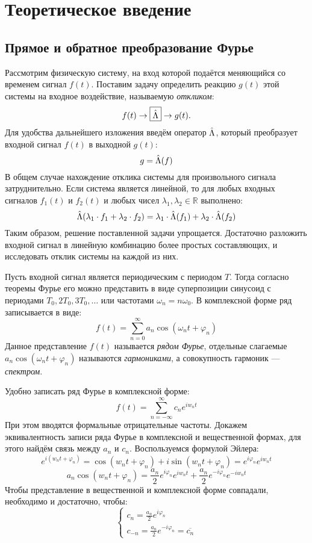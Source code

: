 \section*{Теоретическое введение}

\subsection*{Прямое и обратное преобразование Фурье}

Рассмотрим физическую систему, на вход которой подаётся меняющийся со временем сигнал $f(t)$. Поставим задачу определить реакцию $g(t)$ этой системы на входное воздействие, называемую \textit{откликом}:
$$
f(t) \rightarrow \boxed{\hat{\Lambda}} \rightarrow g(t).
$$
Для удобства дальнейшего изложения введём оператор $\hat{\Lambda}$, который преобразует входной сигнал $f(t)$ в выходной $g(t)$:
$$
g = \hat{\Lambda}(f)
$$
В общем случае нахождение отклика системы для произвольного сигнала затруднительно. Если система является линейной, то для любых входных сигналов $f_1(t)$ и $f_2(t)$ и любых чисел $\lambda_1, \lambda_2 \in \mathbb{R}$ выполнено:
$$
\hat{\Lambda}(\lambda_1 \cdot f_1 + \lambda_2 \cdot f_2) = \lambda_1 \cdot \hat{\Lambda}(f_1) + \lambda_2 \cdot \hat{\Lambda}(f_2)
$$
Таким образом, решение поставленной задачи упрощается. Достаточно разложить входной сигнал в линейную комбинацию более простых составляющих, и исследовать отклик системы на каждой из них.

Пусть входной сигнал является периодическим с периодом $T$. Тогда согласно теоремы Фурье его можно представить в виде суперпозиции синусоид с периодами $T_0, 2T_0, 3T_0, \dots$ или частотами $\omega_n = n \omega_0$. В комплексной форме ряд записывается в виде:
$$
f(t) = \sum_{n = 0}^{\infty}{a_n \cos{(\omega_n t + \varphi_n)}}
$$
Данное представление $f(t)$ называется \textit{рядом Фурье}, отдельные слагаемые $a_n \cos{(\omega_n t + \varphi_n)}$ называются \textit{гармониками}, а совокупность гармоник --- \textit{спектром}.

Удобно записать ряд Фурье в комплексной форме:
$$
f(t) = \sum_{n = -\infty}^{\infty}{c_n e^{i w_n t}}
$$
При этом вводятся формальные отрицательные частоты. Докажем эквивалентность записи ряда Фурье в комплексной и вещественной формах, для этого найдём связь между $a_n$ и $c_n$. Воспользуемся формулой Эйлера:
$$
e^{i (w_n t + \varphi_n)} =\cos{(w_n t + \varphi_n)} + i \sin{(w_n t + \varphi_n)} = e^{i \varphi_n} e^{i w_n t}
$$
$$
a_n \cos{(w_n t + \varphi_n)} = \frac{a_n}{2} e^{i \varphi_n} e^{i w_n t} + \frac{a_n}{2} e^{-i \varphi_n} e^{-i w_n t}
$$
Чтобы представление в вещественной и комплексной форме совпадали, необходимо и достаточно, чтобы:
\begin{equation*}
	\begin{cases}
		c_n = \frac{a_n}{2} e^{i \varphi_n} \\
		c_{-n} = \frac{a_n}{2} e^{-i \varphi_n} = \overline{c_n}
	\end{cases}
\end{equation*}







